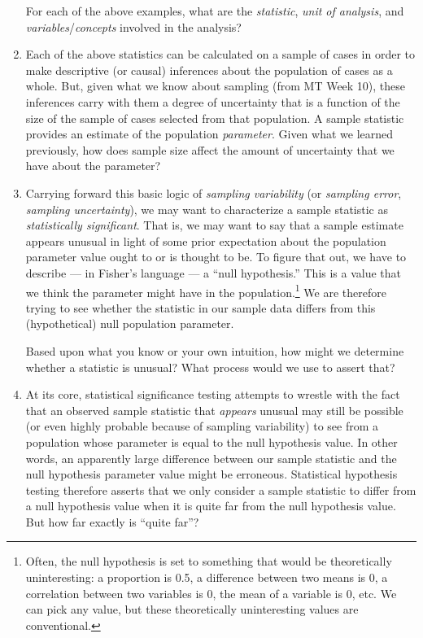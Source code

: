 \documentclass[a4paper,12pt]{article}
\begin{document}
\begin{enumerate}
For each of the above examples, what are the \textit{statistic}, \textit{unit of analysis}, and \textit{variables}/\textit{concepts} involved in the analysis?

\item Each of the above statistics can be calculated on a sample of cases in order to make descriptive (or causal) inferences about the population of cases as a whole. But, given what we know about sampling (from MT Week 10), these inferences carry with them a degree of uncertainty that is a function of the size of the sample of cases selected from that population. A sample statistic provides an estimate of the population \textit{parameter}. Given what we learned previously, how does sample size affect the amount of uncertainty that we have about the parameter?

\vspace{4em}

\item Carrying forward this basic logic of \textit{sampling variability} (or \textit{sampling error}, \textit{sampling uncertainty}), we may want to characterize a sample statistic as \textit{statistically significant}. That is, we may want to say that a sample estimate appears unusual in light of some prior expectation about the population parameter value ought to or is thought to be. To figure that out, we have to describe --- in Fisher's language --- a ``null hypothesis.'' This is a value that we think the parameter might have in the population.\footnote{Often, the null hypothesis is set to something that would be theoretically uninteresting: a proportion is 0.5, a difference between two means is 0, a correlation between two variables is 0, the mean of a variable is 0, etc. We can pick any value, but these theoretically uninteresting values are conventional.} We are therefore trying to see whether the statistic in our sample data differs from this (hypothetical) null population parameter.

Based upon what you know or your own intuition, how might we determine whether a statistic is unusual? What process would we use to assert that?

\vspace{4em}

\item At its core, statistical significance testing attempts to wrestle with the fact that an observed sample statistic that \textit{appears} unusual may still be possible (or even highly probable because of sampling variability) to see from a population whose parameter is equal to the null hypothesis value. In other words, an apparently large difference between our sample statistic and the null hypothesis parameter value might be erroneous. Statistical hypothesis testing therefore asserts that we only consider a sample statistic to differ from a null hypothesis value when it is quite far from the null hypothesis value. But how far exactly is ``quite far''?


\end{enumerate}
\end{document}
